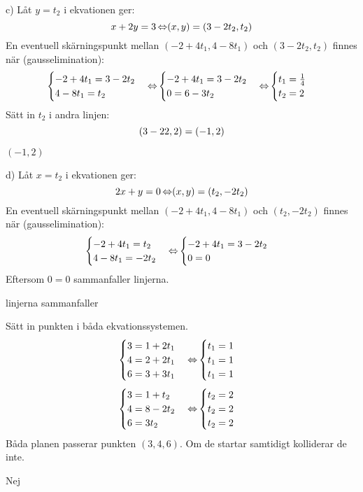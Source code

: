 \begin{task}{c)}
	Låt $y=t_2$ i ekvationen ger:
	\[x+2y=3\operatorname{\Leftrightarrow}
	(x,y)=(3-2t_2,t_2)\]
	En eventuell skärningspunkt mellan $(-2+4t_1,4-8t_1)$ och $(3-2t_2,t_2)$ finnes när (gausselimination):
	\[\begin{cases}
		-2+4t_1=3-2t_2 \\
		4-8t_1=t_2
	\end{cases} \operatorname{\Leftrightarrow}
	\begin{cases}
		-2+4t_1=3-2t_2 \\
		0=6-3t_2
	\end{cases} \operatorname{\Leftrightarrow}
	\begin{cases}
		t_1=\frac{1}{4} \\
		t_2=2
	\end{cases}\]
	Sätt in $t_2$ i andra linjen:
	\[(3-2\*2,2)=(-1,2)\]

	\ans $(-1,2)$
\end{task}

\begin{task}{d)}
	Låt $x=t_2$ i ekvationen ger:
	\[2x+y=0\operatorname{\Leftrightarrow}
	(x,y)=(t_2,-2t_2)\]
	En eventuell skärningspunkt mellan $(-2+4t_1,4-8t_1)$ och $(t_2,-2t_2)$ finnes när (gausselimination):
	\[\begin{cases}
		-2+4t_1=t_2 \\
		4-8t_1=-2t_2
	\end{cases} \operatorname{\Leftrightarrow}
	\begin{cases}
		-2+4t_1=3-2t_2 \\
		0=0
	\end{cases}\]
	Eftersom $0=0$ sammanfaller linjerna.

	\ans linjerna sammanfaller
\end{task}

\begin{task}{3.7}
	Sätt in punkten i båda ekvationssystemen.
	\[\begin{cases}
		3=1+2t_1 \\
		4=2+2t_1 \\
		6=3+3t_1
	\end{cases} \operatorname{\Leftrightarrow}
	\begin{cases}
		t_1=1 \\
		t_1=1 \\
		t_1=1
	\end{cases}\]
	\[\begin{cases}
		3=1+t_2 \\
		4=8-2t_2 \\
		6=3t_2
	\end{cases} \operatorname{\Leftrightarrow}
	\begin{cases}
		t_2=2 \\
		t_2=2 \\
		t_2=2
	\end{cases}\]
	Båda planen passerar punkten $(3,4,6)$. 
	Om de startar samtidigt kolliderar de inte.

	\ans Nej
\end{task}

